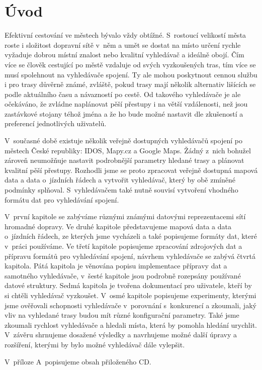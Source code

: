 \chapter*{Úvod}

Efektivní cestování ve městech bývalo vždy obtížné. S~rostoucí velikostí města
roste i složitost dopravní sítě v~něm a umět se dostat na místo určení rychle
vyžaduje dobrou místní znalost nebo kvalitní vyhledávač a ideálně obojí. Čím
více se člověk cestující po městě vzdaluje od svých vyzkoušených tras, tím více
se musí spolehnout na vyhledávače spojení. Ty ale mohou poskytnout cennou službu
i pro trasy důvěrně známé, zvláště, pokud trasy mají několik alternativ lišících
se podle aktuálního času a návazností po cestě. Od takového vyhledávače je ale
očekáváno, že zvládne naplánovat pěší přestupy i na větší vzdálenosti, než jsou
zastávkové stojany téhož jména a že ho bude možné nastavit dle zkušeností a
preferencí jednotlivých uživatelů. 

V~současné době existuje několik veřejně dostupných vyhledávačů spojení po
městech České republiky: IDOS, Mapy.cz a Google Maps. Žádný z~nich bohužel
zároveň neumožňuje nastavit podrobnější parametry hledané trasy a plánovat
kvalitní pěší přestupy. Rozhodli jsme se proto zpracovat veřejně dostupná mapová
data a data o~jízdních řádech a vytvořit vyhledávač, který by obě zmíněné
podmínky splňoval. S~vyhledávačem také nutně souvisí vytvoření vhodného formátu
dat pro vyhledávání spojení.

V~první kapitole se zabýváme různými známými datovými reprezentacemi sítí hromadné
dopravy. Ve druhé kapitole představujeme mapová data a data o~jízdních řádech,
ze kterých jsme vycházeli a také popisujeme formáty dat, které v~práci
používáme. Ve třetí kapitole popisujeme zpracování zdrojových dat a přípravu
formátů pro vyhledávání spojení, návrhem vyhledávače se zabývá čtvrtá kapitola.
Pátá kapitola je věnována popisu implementace přípravy dat a samotného
vyhledávače, v~šesté kapitole jsou podrobně rozepsány používané datové
struktury. Sedmá kapitola je tvořena dokumentací pro uživatele, kteří by si
chtěli vyhledávač vyzkoušet. V~osmé kapitole popisujeme experimenty, kterými
jsme ověřovali schopnosti vyhledávače v~porovnání s~konkurencí a zkoumali, jaký
vliv na vyhledané trasy budou mít různé konfigurační parametry. Také jsme
zkoumali rychlost vyhledávače a hledali místa, která by pomohla hledání
urychlit. V~závěru shrnujeme dosažené výsledky a navrhujeme možné další úpravy
a rozšíření, kterými by bylo možné vyhledávač dále vylepšit.

V~příloze A~popisujeme obsah přiloženého CD.
